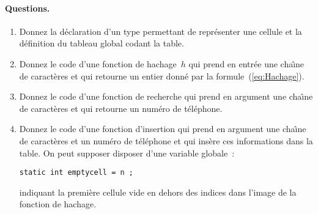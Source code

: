 \paragraph{Questions.}
\begin{enumerate}
\item Donnez la d\'eclaration d'un type permettant de repr\'esenter
  une cellule et la d\'efinition du tableau global codant la table.
\item Donnez  le code d'une   fonction  de hachage~$h$ qui  prend   en
  entr\'ee  une cha\^\i{}ne de  caract\`eres et qui retourne un entier
  donn\'e par la formule~(\ref{eq:Hachage}).
\item Donnez le code d'une fonction de recherche qui prend en argument
  une cha\^\i{}ne de  caract\`eres   et qui  retourne  un num\'ero  de
  t\'el\'ephone.
\item Donnez le code d'une fonction  d'insertion qui prend en argument
  une  cha\^\i{}ne de caract\`eres et  un num\'ero de t\'el\'ephone et
  qui ins\`ere ces informations dans la table. On peut supposer
  disposer d'une variable globale~:
\begin{verbatim}
static int emptycell = n ;
\end{verbatim}
 indiquant la premi\`ere cellule vide en dehors des indices dans l'image de
 la fonction de hachage.
\end{enumerate}
\ifcorrection

